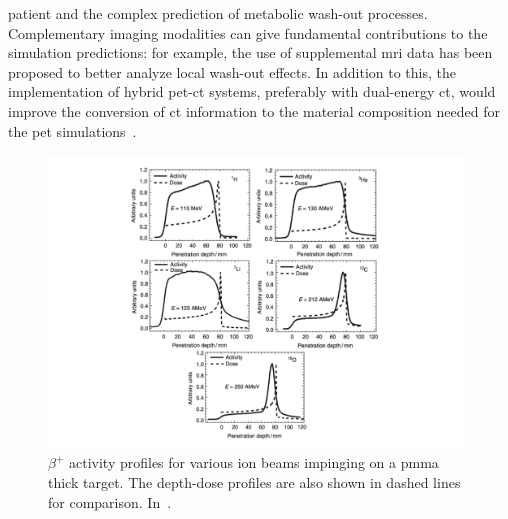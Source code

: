 patient and the complex prediction of metabolic wash-out processes. Complementary imaging modalities can give fundamental contributions to the simulation predictions: for example, the use of supplemental \gls{mri} data has been proposed to better analyze local wash-out effects. In addition to this, the implementation of hybrid \gls{pet}-\gls{ct} systems, preferably with dual-energy \gls{ct}, would improve the conversion of \gls{ct} information to the material composition needed for the \gls{pet} simulations~\parencite{Landry2013}.  

\begin{figure}[!htbp]
\centering
\includegraphics[width=0.98\textwidth]{03_GraphicFiles/chapter1_Introduction/PETrangeProf.pdf}
\caption{$\beta^+$ activity profiles for various ion beams impinging on a \gls{pmma} thick target. The depth-dose profiles are also shown in dashed lines for comparison. In~\cite{Fiedler2012}.}
\label{chap2::fig::PETrangeProf}
\end{figure}   

